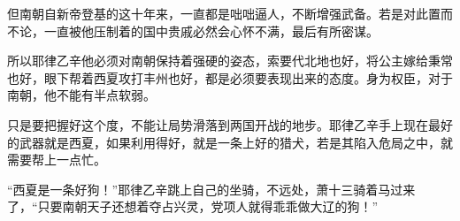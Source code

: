 但南朝自新帝登基的这十年来，一直都是咄咄逼人，不断增强武备。若是对此置而不论，一直被他压制着的国中贵戚必然会心怀不满，最后有所密谋。

所以耶律乙辛他必须对南朝保持着强硬的姿态，索要代北地也好，将公主嫁给秉常也好，眼下帮着西夏攻打丰州也好，都是必须要表现出来的态度。身为权臣，对于南朝，他不能有半点软弱。

只是要把握好这个度，不能让局势滑落到两国开战的地步。耶律乙辛手上现在最好的武器就是西夏，如果利用得好，就是一条上好的猎犬，若是其陷入危局之中，就需要帮上一点忙。

“西夏是一条好狗！”耶律乙辛跳上自己的坐骑，不远处，萧十三骑着马过来了，“只要南朝天子还想着夺占兴灵，党项人就得乖乖做大辽的狗！”

